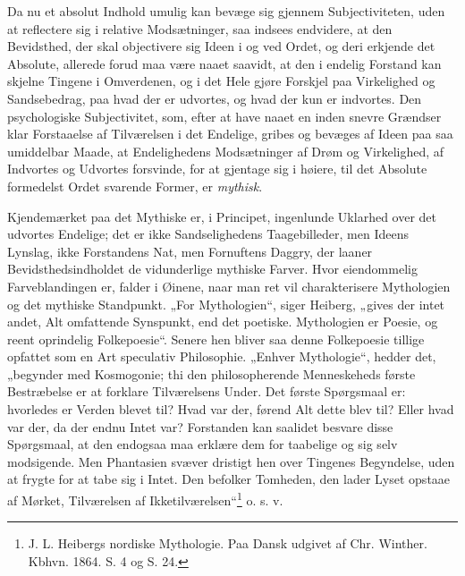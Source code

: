 \documentclass[12pt]{book}
\newcommand{\opage}[1]{\marginnote{\footnotesize\textit{[#1]}}}
\begin{document}
Da nu et absolut Indhold umulig kan bevæge sig gjennem
Subjectiviteten, uden at reflectere sig i relative Modsætninger,
saa indsees endvidere, at den Bevidsthed, der skal objectivere
sig Ideen i og ved Ordet, og deri erkjende det Absolute,
allerede forud maa være naaet saavidt, at den i endelig
Forstand kan skjelne Tingene i Omverdenen, og i det Hele
gjøre Forskjel paa Virkelighed og Sandsebedrag, paa hvad der
er udvortes, og hvad der kun er indvortes. Den psychologiske
Subjectivitet, som, efter at have naaet en inden snevre
\opage{74}Grændser klar Forstaaelse af Tilværelsen i det Endelige,
gribes og bevæges af Ideen paa saa umiddelbar Maade, at
Endelighedens Modsætninger af Drøm og Virkelighed, af
Indvortes og Udvortes forsvinde, for at gjentage sig i høiere,
til det Absolute formedelst Ordet svarende Former, er \emph{mythisk}.

Kjendemærket paa det Mythiske er, i Principet, ingenlunde
Uklarhed over det udvortes Endelige; det er ikke Sandselighedens
Taagebilleder, men Ideens Lynslag, ikke Forstandens
Nat, men Fornuftens Daggry, der laaner Bevidsthedsindholdet
de vidunderlige mythiske Farver. Hvor eiendommelig Farveblandingen
er, falder i Øinene, naar man ret vil charakterisere
Mythologien og det mythiske Standpunkt. „For Mythologien“,
siger Heiberg, „gives der intet andet, Alt omfattende Synspunkt,
end det poetiske. Mythologien er Poesie, og reent oprindelig
Folkepoesie“. Senere hen bliver saa denne Folkepoesie
tillige opfattet som en Art speculativ Philosophie. „Enhver
Mythologie“, hedder det, „begynder med Kosmogonie;
thi den philosopherende Menneskeheds første Bestræbelse er at
forklare Tilværelsens Under. Det første Spørgsmaal er:
hvorledes er Verden blevet til? Hvad var der, førend Alt
dette blev til? Eller hvad var der, da der endnu Intet var?
Forstanden kan saalidet besvare disse Spørgsmaal, at den endogsaa
maa erklære dem for taabelige og sig selv modsigende.
Men Phantasien svæver dristigt hen over Tingenes Begyndelse,
uden at frygte for at tabe sig i Intet. Den befolker Tomheden,
den lader Lyset opstaae af Mørket, Tilværelsen af Ikketilværelsen“\footnote{%
J. L. Heibergs nordiske Mythologie. Paa Dansk udgivet af Chr.
Winther. Kbhvn. 1864. S. 4 og S. 24.} o. s. v.
\end{document}

